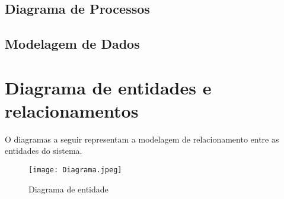 \subsection{Diagrama de Processos}



\subsection{Modelagem de Dados}

\section{Diagrama de entidades e relacionamentos}
O diagramas a seguir representam a modelagem de relacionamento entre as entidades do sistema.

\begin{figure}[!ht]
  \caption{Diagrama de entidade}
  \centering
  \texttt{[image: Diagrama.jpeg]}
\end{figure}